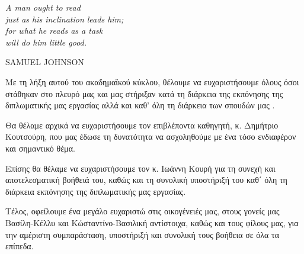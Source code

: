 \clearpage

\thispagestyle{empty}
\null\vfill

\settowidth{}
\begin{center}
	\parbox{\longest}{%
	  \raggedright{\huge\itshape%
	   A man ought to read \\ 
	  just as his inclination leads him; \\
	  for what he reads as a task \\ 
	  will do him little good.\par\bigskip
	  }   
	  \raggedleft\Large\MakeUppercase{Samuel Johnson}\par%
	}
\end{center}
\vfill\vfill

\clearpage


\begin{acknowledgementsgr}
Με τη λήξη αυτού του ακαδημαϊκού κύκλου, θέλουμε να ευχαριστήσουμε όλους όσοι στάθηκαν στο πλευρό μας και μας στήριξαν κατά τη διάρκεια της εκπόνησης της διπλωματικής μας εργασίας αλλά και καθ’ όλη τη διάρκεια των σπουδών μας .

Θα θέλαμε αρχικά να ευχαριστήσουμε τον επιβλέποντα καθηγητή, κ. Δημήτριο Κουτσούρη, που μας έδωσε τη δυνατότητα να ασχοληθούμε με ένα τόσο ενδιαφέρον και σημαντικό θέμα.

Επίσης θα θέλαμε να ευχαριστήσουμε τον κ. Ιωάννη Κουρή για τη συνεχή και αποτελεσματική βοήθειά του, καθώς και τη συνολική υποστήριξή του καθ΄ όλη τη διάρκεια εκπόνησης της διπλωματικής μας εργασίας.

Τέλος, οφείλουμε ένα μεγάλο ευχαριστώ στις οικογένειές μας, στους γονείς μας Βασίλη-Κέλλυ και Κώσταντίνο-Βασιλική αντίστοιχα, καθώς και τους φίλους μας, για την αμέριστη συμπαράσταση, υποστήριξή και συνολική τους βοήθεια σε όλα τα επίπεδα.
\end{acknowledgementsgr}

